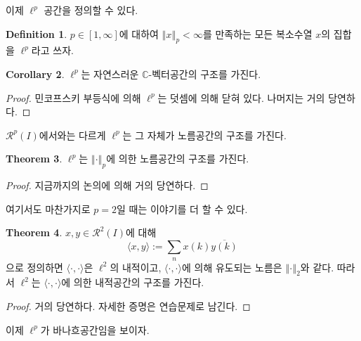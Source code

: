 \documentclass[11pt]{book}
\numberwithin{equation}{chapter}
\def\CC{\mathbb{C}}
\def\calR{\mathcal{R}}
\newcommand{\inner}[2]{\langle#1, #2\rangle}
\newcommand{\norm}[1]{\left\Vert#1\right\Vert}
\theoremstyle{definition}
\newtheorem{thm}{Theorem}[section]
\newtheorem{cor}[thm]{Corollary}
\newtheorem{defn}[thm]{Definition}
\begin{document}
이제 \(\ell^p\) 공간을 정의할 수 있다.

\begin{defn}
    \(p \in [1, \infty]\)에 대하여 \(\norm{x}_p < \infty\)를 만족하는 모든 복소수열 \(x\)의 집합을 \(\ell^p\)라고 쓰자.
\end{defn}

\begin{cor}
    \(\ell^p\)는 자연스러운 \(\CC\)-벡터공간의 구조를 가진다.
\end{cor}
\begin{proof}
    민코프스키 부등식에 의해 \(\ell^p\)는 덧셈에 의해 닫혀 있다. 나머지는 거의 당연하다.
\end{proof}

\(\calR^p(I)\)에서와는 다르게 \(\ell^p\)는 그 자체가 노름공간의 구조를 가진다.

\begin{thm}
    \(\ell^p\)는 \(\norm{\cdot}_p\)에 의한 노름공간의 구조를 가진다.
\end{thm}
\begin{proof}
    지금까지의 논의에 의해 거의 당연하다.
\end{proof}

여기서도 마찬가지로 \(p = 2\)일 때는 이야기를 더 할 수 있다.

\begin{thm}
    \(x, y \in \calR^2(I)\)에 대해
    \[
    \inner{x}{y} := \sum_n x(k) \overline{y(k)}    
    \]
    으로 정의하면 \(\inner{\cdot}{\cdot}\)은 \(\ell^2\)의 내적이고, \(\inner{\cdot}{\cdot}\)에 의해 유도되는 노름은 \(\norm{\cdot}_2\)와 같다. 따라서 \(\ell^2\)는 \(\inner{\cdot}{\cdot}\)에 의한 내적공간의 구조를 가진다.
\end{thm}
\begin{proof}
    거의 당연하다. 자세한 증명은 연습문제로 남긴다.
\end{proof}

이제 \(\ell^p\)가 바나흐공간임을 보이자.
\end{document}
